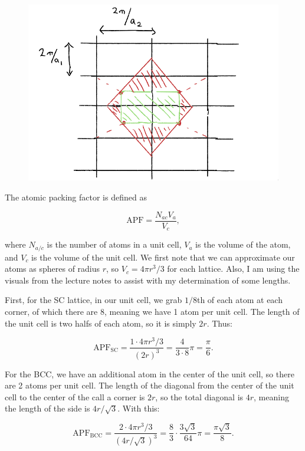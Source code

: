 \begin{parts}
  \begin{figure}
    \centering
    \includegraphics[width=0.6\linewidth]{./res/Pics/5-b.png}
    \caption{}\label{fig:5-b}
  \end{figure}




\item The atomic packing factor is defined as

  \begin{equation}
    \mathrm{APF} = \frac{N_{ac}V_a}{V_c},
  \end{equation}

  where $N_{a/c}$ is the number of atoms in a unit cell, $V_a$ is the volume of the atom, and $V_c$ is the volume of the unit cell. We first note that we can approximate our atoms as spheres of radius $r$, so $V_c = 4\pi r^3/3$ for each lattice. Also, I am using the visuals from the lecture notes to assist with my determination of some lengths.

  First, for the SC lattice, in our unit cell, we grab $1/8$th of each atom at each corner, of which there are 8, meaning we have 1 atom per unit cell. The length of the unit cell is two halfs of each atom, so it is simply $2r$. Thus:

  \begin{equation}
    \mathrm{APF}_{\mathrm{SC}} = \frac{1 \cdot 4\pi r^3/3}{(2r)^3} = \frac{4}{3\cdot8}\pi = \frac{\pi}{6}.
  \end{equation}

  For the BCC, we have an additional atom in the center of the unit cell, so there are 2 atoms per unit cell. The length of the diagonal from the center of the unit cell to the center of the call a corner is $2r$, so the total diagonal is $4r$, meaning the length of the side is $4r/\sqrt{3}$. With this:

  \begin{equation}
    \mathrm{APF}_{\mathrm{BCC}} = \frac{2 \cdot 4\pi r^3/3}{(4r/\sqrt{3})^3} = \frac{8}{3} \cdot \frac{3\sqrt{3}}{64}\pi = \frac{\pi\sqrt{3}}{8}.
  \end{equation}


\end{parts}
